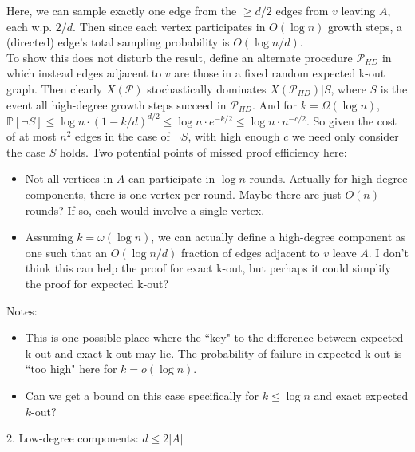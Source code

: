 \documentclass{article}
\begin{document}
	Here, we can sample exactly one edge from the $\ge d/2$ edges from $v$ leaving $A$, each w.p. $2/d$. Then since each vertex participates in $O(\log n)$ growth steps, a (directed) edge's total sampling probability is $O(\log n/d)$.\\
	To show this does not disturb the result, define an alternate procedure $\mathcal P_{HD}$ in which instead edges adjacent to $v$ are those in a fixed random expected k-out graph. Then clearly $X(\mathcal P)$ stochastically dominates $X(\mathcal P_{HD}) | S$, where $S$ is the event all high-degree growth steps succeed in $\mathcal P_{HD}$. And for $k = \Omega (\log n)$, $\mathbb P[\neg S] \le \log n \cdot (1 - k / d)^{d / 2} \le \log n \cdot e^{-k / 2} \le \log n \cdot n^{-c / 2}$. So given the cost of at most $n^2$ edges in the case of $\neg S$, with high enough $c$ we need only consider the case $S$ holds.
	Two potential points of missed proof efficiency here:
	\begin{itemize}
		\item Not all vertices in $A$ can participate in $\log n$ rounds. Actually for high-degree components, there is one vertex per round. Maybe there are just $O(n)$ rounds? If so, each would involve a single vertex.
		\item Assuming $k = \omega(\log n)$, we can actually define a high-degree component as one such that an $O(\log n / d)$ fraction of edges adjacent to $v$ leave $A$. I don't think this can help the proof for exact k-out, but perhaps it could simplify the proof for expected k-out?
	\end{itemize}
	Notes:
		\begin{itemize}
			\item This is one possible place where the ``key" to the difference between expected k-out and exact k-out may lie. The probability of failure in expected k-out is ``too high" here for $k = o(\log n)$.
			\item Can we get a bound on this case specifically for $k \leq \log n$ and exact expected $k$-out?
		\end{itemize}
	2. Low-degree components: $d \leq 2\left| A \right|$
\end{document}
